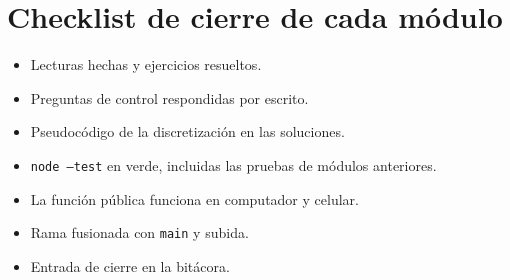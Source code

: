 \documentclass[11pt,a4paper]{article}
\begin{document}
\section{Checklist de cierre de cada módulo}

\begin{itemize}[leftmargin=*]
  \item[{\faSquare[regular]}] Lecturas hechas y ejercicios resueltos.
  \item[{\faSquare[regular]}] Preguntas de control respondidas por escrito.
  \item[{\faSquare[regular]}] Pseudocódigo de la discretización en las soluciones.
  \item[{\faSquare[regular]}] \texttt{node --test} en verde, incluidas las pruebas de módulos anteriores.
  \item[{\faSquare[regular]}] La función pública funciona en computador y celular.
  \item[{\faSquare[regular]}] Rama fusionada con \texttt{main} y subida.
  \item[{\faSquare[regular]}] Entrada de cierre en la bitácora.
\end{itemize}
\end{document}
